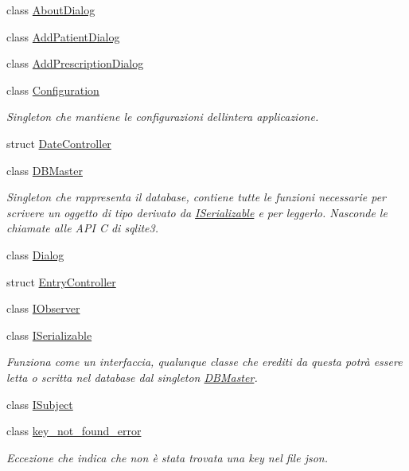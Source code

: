 \begin{DoxyCompactItemize}
\item 
class \hyperlink{classmm_1_1_about_dialog}{About\+Dialog}
\item 
class \hyperlink{classmm_1_1_add_patient_dialog}{Add\+Patient\+Dialog}
\item 
class \hyperlink{classmm_1_1_add_prescription_dialog}{Add\+Prescription\+Dialog}
\item 
class \hyperlink{classmm_1_1_configuration}{Configuration}
\begin{DoxyCompactList}\small\item\em Singleton che mantiene le configurazioni dell\textquotesingle{}intera applicazione. \end{DoxyCompactList}\item 
struct \hyperlink{structmm_1_1_date_controller}{Date\+Controller}
\item 
class \hyperlink{classmm_1_1_d_b_master}{D\+B\+Master}
\begin{DoxyCompactList}\small\item\em Singleton che rappresenta il database, contiene tutte le funzioni necessarie per scrivere un oggetto di tipo derivato da \hyperlink{classmm_1_1_i_serializable}{I\+Serializable} e per leggerlo. Nasconde le chiamate alle A\+PI C di sqlite3. \end{DoxyCompactList}\item 
class \hyperlink{classmm_1_1_dialog}{Dialog}
\item 
struct \hyperlink{structmm_1_1_entry_controller}{Entry\+Controller}
\item 
class \hyperlink{classmm_1_1_i_observer}{I\+Observer}
\item 
class \hyperlink{classmm_1_1_i_serializable}{I\+Serializable}
\begin{DoxyCompactList}\small\item\em Funziona come un interfaccia, qualunque classe che erediti da questa potrà essere letta o scritta nel database dal singleton \hyperlink{classmm_1_1_d_b_master}{D\+B\+Master}. \end{DoxyCompactList}\item 
class \hyperlink{classmm_1_1_i_subject}{I\+Subject}
\item 
class \hyperlink{classmm_1_1key__not__found__error}{key\+\_\+not\+\_\+found\+\_\+error}
\begin{DoxyCompactList}\small\item\em Eccezione che indica che non è stata trovata una key nel file json. \end{DoxyCompactList}\item 

\end{DoxyCompactItemize}
